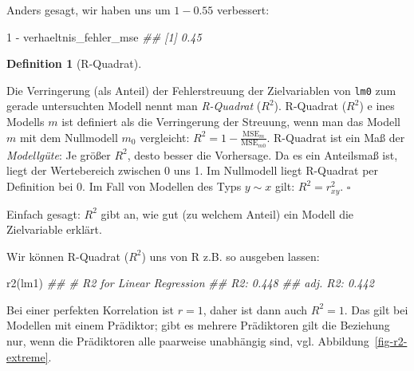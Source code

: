 \documentclass[
  letterpaper,
]{scrbook}
\newenvironment{Shaded}{\begin{snugshade}}{\end{snugshade}}
\newcommand{\DecValTok}[1]{\textcolor[rgb]{0.68,0.00,0.00}{#1}}
\newcommand{\DocumentationTok}[1]{\textcolor[rgb]{0.37,0.37,0.37}{\textit{#1}}}
\newcommand{\FunctionTok}[1]{\textcolor[rgb]{0.28,0.35,0.67}{#1}}
\newcommand{\NormalTok}[1]{\textcolor[rgb]{0.00,0.23,0.31}{#1}}
\newcommand{\SpecialCharTok}[1]{\textcolor[rgb]{0.37,0.37,0.37}{#1}}
\theoremstyle{definition}
\theoremstyle{definition}
\newtheorem{definition}{Definition}[chapter]
\theoremstyle{definition}
\theoremstyle{remark}
\begin{document}
Anders gesagt, wir haben uns um \(1 - 0.55\) verbessert:

\begin{Shaded}
\begin{Highlighting}[]
\DecValTok{1} \SpecialCharTok{{-}}\NormalTok{ verhaeltnis\_fehler\_mse}
\DocumentationTok{\#\# [1] 0.45}
\end{Highlighting}
\end{Shaded}

\begin{definition}[R-Quadrat]\protect\hypertarget{def-r2}{}\label{def-r2}

Die Verringerung (als Anteil) der Fehlerstreuung der Zielvariablen von
\texttt{lm0} zum gerade untersuchten Modell nennt man \emph{R-Quadrat}
(\(R^2\)). R-Quadrat (\(R^2\)) e ines Modells \(m\) ist definiert als
die Verringerung der Streuung, wenn man das Modell \(m\) mit dem
Nullmodell \(m_0\) vergleicht:
\(R^2 =1-  \frac{\text{MSE}_{m}}{\text{MSE}_{m0}}\). R-Quadrat ist ein
Maß der \emph{Modellgüte}: Je größer \(R^2\), desto besser die
Vorhersage. Da es ein Anteilsmaß ist, liegt der Wertebereich zwischen 0
uns 1. Im Nullmodell liegt R-Quadrat per Definition bei 0. Im Fall von
Modellen des Typs \(y\sim x\) gilt: \(R^2 = r_{xy}^2\). \(\square\)

\end{definition}

Einfach gesagt: \(R^2\) gibt an, wie gut (zu welchem Anteil) ein Modell
die Zielvariable erklärt.

Wir können R-Quadrat (\(R^2\)) uns von R z.B. so ausgeben lassen:

\begin{Shaded}
\begin{Highlighting}[]
\FunctionTok{r2}\NormalTok{(lm1)}
\DocumentationTok{\#\# \# R2 for Linear Regression}
\DocumentationTok{\#\#        R2: 0.448}
\DocumentationTok{\#\#   adj. R2: 0.442}
\end{Highlighting}
\end{Shaded}

Bei einer perfekten Korrelation ist \(r=1\), daher ist dann auch
\(R^2 = 1\). Das gilt bei Modellen mit einem Prädiktor; gibt es mehrere
Prädiktoren gilt die Beziehung nur, wenn die Prädiktoren alle paarweise
unabhängig sind, vgl. Abbildung~\ref{fig-r2-extreme}.
\end{document}
